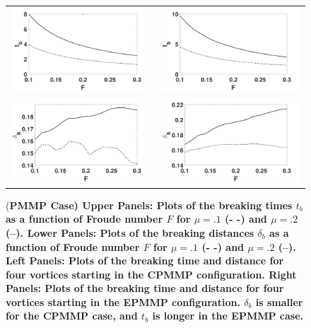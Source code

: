 \documentclass[a4paper,11pt]{article}
\begin{document}
\begin{figure}[!h]
\centering
\begin{tabular}{cc}
\includegraphics[width=.5\textwidth]{froude_comp_pmmp} & \includegraphics[width=.5\textwidth]{froude_comp_pmmp_sym}\\
\includegraphics[width=.5\textwidth]{zmb_pmmp} & \includegraphics[width=.5\textwidth]{zmb_pmmp_sym}
\end{tabular}
\caption{\small (\bf PMMP Case) Upper Panels: Plots of the breaking times $t_{b}$ as a function of Froude number $F$ for $\mu=.1$ (- -) and $\mu=.2$ (--).  Lower Panels: Plots of the breaking distances $\delta_{b}$ as a function of Froude number $F$ for $\mu=.1$ (- -) and $\mu=.2$ (--). Left Panels: Plots of the breaking time and distance for four vortices starting in the CPMMP configuration.  Right Panels: Plots of the breaking time and distance for four vortices starting in the EPMMP configuration.  $\delta_{b}$ is smaller for the CPMMP case, and $t_{b}$ is longer in the EPMMP case.}
\label{fig:froudecomp_pmmp}
\end{figure}
\end{document}
